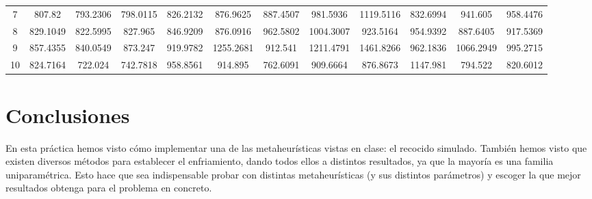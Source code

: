 \documentclass[12pt,a4paper,twoside,openright,titlepage,final]{article}
\begin{document}
\begin{landscape}
\begin{table}[htbp!]
{\begin{tabular}{@{}cccccccccccc@{}}
				7         & 807.82                           & \cellcolor[HTML]{FFFE65}793.2306 & 798.0115                         & 826.2132        & 876.9625          & 887.4507          & 981.5936          & 1119.5116         & 832.6994          & 941.605           & 958.4476           \\
				8         & 829.1049                         & \cellcolor[HTML]{FFFE65}822.5995 & 827.965                          & 846.9209        & 876.0916          & 962.5802          & 1004.3007         & 923.5164          & 954.9392          & 887.6405          & 917.5369           \\
				9         & 857.4355                         & \cellcolor[HTML]{FFFE65}840.0549 & 873.247                          & 919.9782        & 1255.2681         & 912.541           & 1211.4791         & 1461.8266         & 962.1836          & 1066.2949         & 995.2715           \\
				10        & 824.7164                         & \cellcolor[HTML]{FFFE65}722.024  & 742.7818                         & 958.8561        & 914.895           & 762.6091          & 909.6664          & 876.8673          & 1147.981          & 794.522           & 820.6012           \\ \bottomrule
			\end{tabular}
		}
	\end{table}
	\vspace*{\fill}
\end{landscape}

\section{Conclusiones}

En esta práctica hemos visto cómo implementar una de las metaheurísticas vistas en clase: el recocido simulado. También hemos visto que existen diversos métodos para establecer el enfriamiento, dando todos ellos a distintos resultados, ya que la mayoría es una familia uniparamétrica. Esto hace que sea indispensable probar con distintas metaheurísticas (y sus distintos parámetros) y escoger la que mejor resultados obtenga para el problema en concreto.
\end{document}
